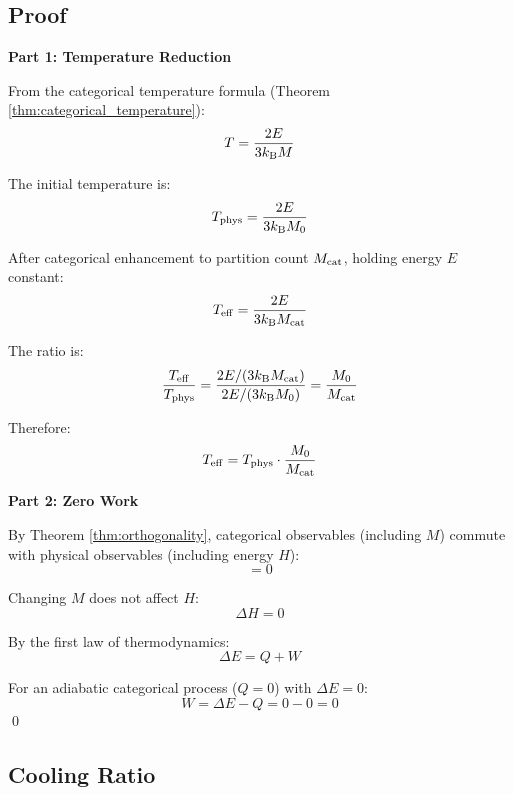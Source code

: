 \subsection{Proof}

\textbf{Part 1: Temperature Reduction}

From the categorical temperature formula (Theorem \ref{thm:categorical_temperature}):
\begin{equation}
T = \frac{2E}{3k_{\mathrm{B}} M}
\end{equation}

The initial temperature is:
\begin{equation}
T_{\mathrm{phys}} = \frac{2E}{3k_{\mathrm{B}} M_0}
\end{equation}

After categorical enhancement to partition count $M_{\mathrm{cat}}$, holding energy $E$ constant:
\begin{equation}
T_{\mathrm{eff}} = \frac{2E}{3k_{\mathrm{B}} M_{\mathrm{cat}}}
\end{equation}

The ratio is:
\begin{equation}
\frac{T_{\mathrm{eff}}}{T_{\mathrm{phys}}} = \frac{2E/(3k_{\mathrm{B}} M_{\mathrm{cat}})}{2E/(3k_{\mathrm{B}} M_0)} = \frac{M_0}{M_{\mathrm{cat}}}
\end{equation}

Therefore:
\begin{equation}
T_{\mathrm{eff}} = T_{\mathrm{phys}} \cdot \frac{M_0}{M_{\mathrm{cat}}}
\end{equation}

\textbf{Part 2: Zero Work}

By Theorem \ref{thm:orthogonality}, categorical observables (including $M$) commute with physical observables (including energy $H$):
\begin{equation}
[M, H] = 0
\end{equation}

Changing $M$ does not affect $H$:
\begin{equation}
\Delta H = 0
\end{equation}

By the first law of thermodynamics:
\begin{equation}
\Delta E = Q + W
\end{equation}

For an adiabatic categorical process ($Q = 0$) with $\Delta E = 0$:
\begin{equation}
W = \Delta E - Q = 0 - 0 = 0
\end{equation}
\qed

\subsection{Cooling Ratio}

